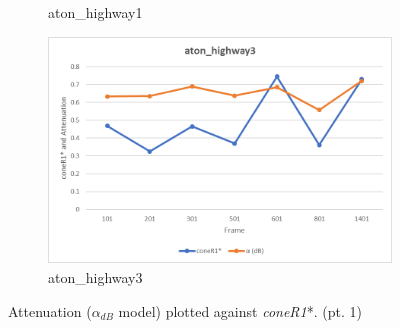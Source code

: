 \begin{appendices}
\begin{figure}
\begin{subfigure}{.45\linewidth}
  \caption{aton\_highway1}
\end{subfigure}
\hfill
\begin{subfigure}{.45\linewidth}
  \includegraphics[width=1\linewidth]{figures/appendix/highway3_db.jpg}
  \caption{aton\_highway3}
\end{subfigure}

\caption{Attenuation ($\alpha_{dB}$ model) plotted against \textit{coneR1}*. (pt. 1)}
\end{figure}


\end{appendices}
